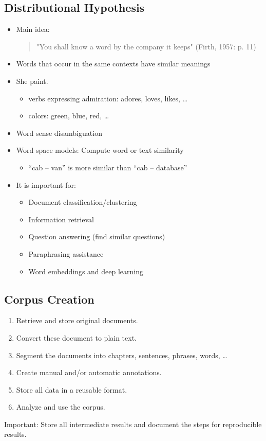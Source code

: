 	\subsection{Distributional Hypothesis}
		\begin{itemize}
			\item Main idea: \begin{quote}
					"You shall know a word by the company it keeps" (Firth, 1957: p. 11)
				\end{quote}
			\item Words that occur in the same contexts have similar meanings
			\item She   paint.
				\begin{itemize}
					\item verbs expressing admiration: adores, loves, likes, \dots
					\item colors: green, blue, red, \dots
				\end{itemize}
			\item Word sense disambiguation
			\item Word space models: Compute word or text similarity
				\begin{itemize}
					\item \enquote{cab – van} is more similar than \enquote{cab – database}
				\end{itemize}
			\item It is important for:
				\begin{itemize}
					\item Document classification/clustering
					\item Information retrieval
					\item Question answering (find similar questions)
					\item Paraphrasing assistance
					\item Word embeddings and deep learning
				\end{itemize}
		\end{itemize}

		\subsection{Corpus Creation} %
			\begin{enumerate}
				\item Retrieve and store original documents.
				\item Convert these document to plain text.
				\item Segment the documents into chapters, sentences, phrases, words, \dots
				\item Create manual and/or automatic annotations.
				\item Store all data in a reusable format.
				\item Analyze and use the corpus.
			\end{enumerate}
			Important: Store all intermediate results and document the steps for reproducible results.


